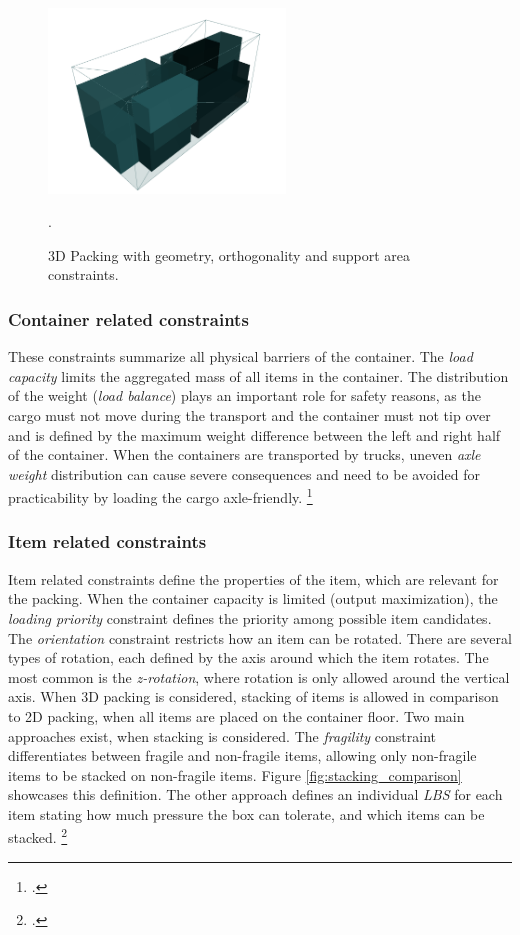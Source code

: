 \begin{figure}[ht]
    \centering
    \includegraphics[width=6.3cm]{pictures/3l_cvrp_example.png}
    \caption[Visualized 3D packing with packing constraints.]{3D Packing with geometry, orthogonality and support area constraints.\footnotemark}.
    \label{fig:solution-visualization}
\end{figure}

\subsubsection{Container related constraints}
These constraints summarize all physical barriers of the container. The \textit{load capacity} limits the aggregated
mass of all items in the container. The distribution of the weight (\textit{load balance})
plays an important role for safety reasons, as the cargo must not move during the transport and the container
must not tip over and is defined by the maximum weight difference between the left and right half of the container.
When the containers are transported by trucks, uneven \textit{axle weight} distribution can cause severe
consequences and need to be avoided for practicability by loading the cargo axle-friendly. \footcite[cf.][pp. 849--850]{krebs_advanced_2021}

\subsubsection{Item related constraints}
Item related constraints define the properties of the item, which are relevant
for the packing. When the container capacity is limited (output maximization),
the \textit{loading priority} constraint defines the priority among possible
item candidates. The \textit{orientation} constraint restricts how an item can be rotated.
There are several types of rotation, each defined by the axis around which the item rotates.
The most common is the \textit{z-rotation}, where rotation is only allowed around the vertical axis.
When 3D packing is considered, stacking of items is allowed in comparison to 2D packing, when all
items are placed on the container floor. Two main approaches exist, when stacking is considered.
The \textit{fragility} constraint differentiates between fragile and non-fragile items,
allowing only non-fragile items to be stacked on non-fragile items. Figure \ref{fig:stacking_comparison} showcases
this definition. The other approach defines an individual \textit{\gls{LBS}} for each
item stating how much pressure the box can tolerate, and which items can be stacked. \footcite[cf.][pp. 847--848]{krebs_advanced_2021}

